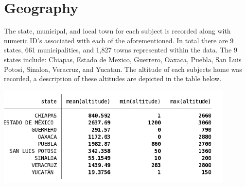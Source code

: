 \documentclass{article}
\begin{document}
\section{Geography}
The state, municipal, and local town for each subject is recorded along with numeric ID's associated with each of the aforementioned. In total there are 9 states, 661 municipalities, and 1,827 towns represented within the data. The 9 states include: Chiapas, Estado de Mexico, Guerrero, Oaxaca, Puebla, San Luis Potosi, Sinaloa, Veracruz, and Yucatan. The altitude of each subjects home was recorded, a description of these altitudes are depicted in the table below.
\begin{center}
\includegraphics[scale=.75]{OverviewAux/altitude}

\end{center}
\end{document}
